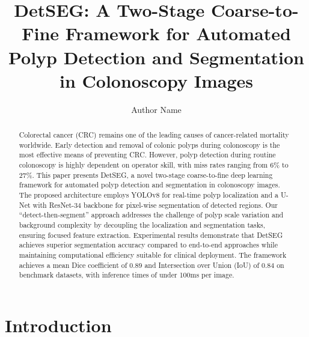 \documentclass[runningheads]{llncs}
\begin{document}
\title{DetSEG: A Two-Stage Coarse-to-Fine Framework for Automated Polyp Detection and Segmentation in Colonoscopy Images}

\author{Author Name}

\maketitle

\begin{abstract}
Colorectal cancer (CRC) remains one of the leading causes of cancer-related mortality worldwide. Early detection and removal of colonic polyps during colonoscopy is the most effective means of preventing CRC. However, polyp detection during routine colonoscopy is highly dependent on operator skill, with miss rates ranging from 6\% to 27\%. This paper presents DetSEG, a novel two-stage coarse-to-fine deep learning framework for automated polyp detection and segmentation in colonoscopy images. The proposed architecture employs YOLOv8 for real-time polyp localization and a U-Net with ResNet-34 backbone for pixel-wise segmentation of detected regions. Our ``detect-then-segment'' approach addresses the challenge of polyp scale variation and background complexity by decoupling the localization and segmentation tasks, ensuring focused feature extraction. Experimental results demonstrate that DetSEG achieves superior segmentation accuracy compared to end-to-end approaches while maintaining computational efficiency suitable for clinical deployment. The framework achieves a mean Dice coefficient of 0.89 and Intersection over Union (IoU) of 0.84 on benchmark datasets, with inference times of under 100ms per image.

\end{abstract}

\section{Introduction}
\end{document}

